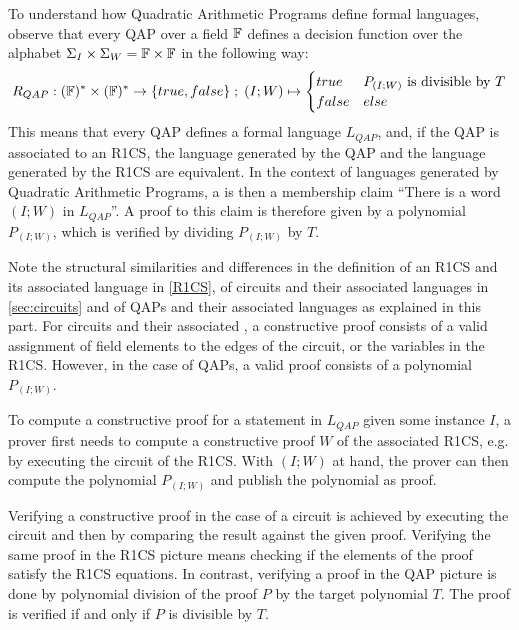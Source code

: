 To understand how Quadratic Arithmetic Programs define formal languages, observe that every QAP over a field $\mathbb{F}$ defines a decision function over the alphabet $\Sigma_I \times \Sigma_W = \mathbb{F} \times \mathbb{F}$ in the following way:
\begin{equation}
R_{QAP} : (\mathbb{F})^* \times (\mathbb{F})^* \to \{true, false\}\;;\;
(I;W) \mapsto
\begin{cases}
true & P_{(I;W)} \text{ is divisible by } T\\
false & else
\end{cases}
\end{equation}
This means that every QAP defines a formal language $L_{QAP}$, and, if the QAP is associated to an R1CS, the language generated by the QAP and the language generated by the R1CS are equivalent. In the context of languages generated by Quadratic Arithmetic Programs, a  is then a membership claim ``There is a word $(I;W)$ in $L_{QAP}$''. A proof to this claim is therefore given by a polynomial $P_{(I;W)}$, which is verified by dividing $P_{(I;W)}$ by $T$.

Note the structural similarities and differences in the definition of an R1CS and its associated language in \ref{R1CS}, of circuits and their associated languages in \ref{sec:circuits} and of QAPs and their associated languages as explained in this part. For circuits and their associated , a constructive proof consists of a valid assignment of field elements to the edges of the circuit, or the variables in the R1CS. However, in the case of QAPs, a valid proof consists of a polynomial $P_{(I;W)}$.

To compute a constructive proof for a statement in $L_{QAP}$ given some instance $I$, a prover first needs to compute a constructive proof $W$ of the associated R1CS, e.g. by executing the circuit of the R1CS. With $(I;W)$ at hand, the prover can then compute the polynomial $P_{(I;W)}$ and publish the polynomial as proof.

Verifying a constructive proof in the case of a circuit is achieved by executing the circuit and then by comparing the result against the given proof. Verifying the same proof in the R1CS picture means checking if the elements of the proof satisfy the R1CS equations. In contrast, verifying a proof in the QAP picture is done by polynomial division of the proof $P$ by the target polynomial $T$. The proof is verified if and only if $P$ is divisible by $T$.

